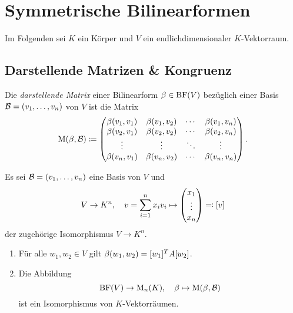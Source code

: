 \section{Symmetrische Bilinearformen}

Im Folgenden sei $K$ ein Körper und $V$ ein endlichdimensionaler $K$-Vektorraum.





\subsection{Darstellende Matrizen \& Kongruenz}

\begin{definition}
  \label{definition: representing matrix for a bilinear form}
  Die \emph{darstellende Matrix} einer Bilinearform $\beta \in \operatorname{BF}(V)$ bezüglich einer Basis $\mathcal{B} = (v_1, \dotsc, v_n)$ von $V$ ist die Matrix
  \[
              \operatorname{M}(\beta, \mathcal{B})
    \coloneqq \begin{pmatrix}
                \beta(v_1, v_1) & \beta(v_1, v_2) & \cdots  & \beta(v_1, v_n) \\
                \beta(v_2, v_1) & \beta(v_2, v_2) & \cdots  & \beta(v_2, v_n) \\
                \vdots          & \vdots          & \ddots  & \vdots          \\
                \beta(v_n, v_1) & \beta(v_n, v_2) & \cdots  & \beta(v_n, v_n)
              \end{pmatrix}.
  \]
\end{definition}

\begin{proposition}
  Es sei $\mathcal{B} = (v_1, \dotsc, v_n)$ eine Basis von $V$ und
  \[
              V
    \to       K^n,
    \quad     v
    =         \sum_{i=1}^n x_i v_i
    \mapsto   \begin{pmatrix} x_1 \\ \vdots \\ x_n \end{pmatrix}
    \eqqcolon [v]
  \]
  der zugehörige Isomorphismus $V \to K^n$.
  \begin{enumerate}
    \item
      Für alle $w_1, w_2 \in V$ gilt $\beta(w_1, w_2) = [w_1]^T A [w_2]$.
    \item
      Die Abbildung
      \[
                \operatorname{BF}(V)
        \to     \operatorname{M}_{n}(K),
        \quad   \beta
        \mapsto \operatorname{M}(\beta, \mathcal{B})     
      \]
      ist ein Isomorphismus von $K$-Vektorräumen.
  \end{enumerate}
\end{proposition}

